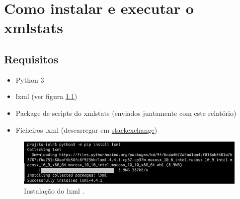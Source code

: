 \documentclass[11pt,a4paper]{report}%
\begin{document}
\chapter{Como instalar e executar o xmlstats}
\section{Requisitos}
\begin{itemize}
    \item Python 3
    \item lxml (ver figura \ref{img:lxml})
    \item Package de scripts do xmlstats (enviados juntamente com este relatório)
    \item Ficheiros .xml (descarregar em \href{https://archive.org/download/stackexchange}{stackexchange})
\end{itemize}{}

\begin{figure}[h]
	\centering
	\includegraphics[scale=0.6]{lxml.png}
	\caption{Instalação do lxml .}
	\label{img:lxml}
\end{figure}
\end{document}
